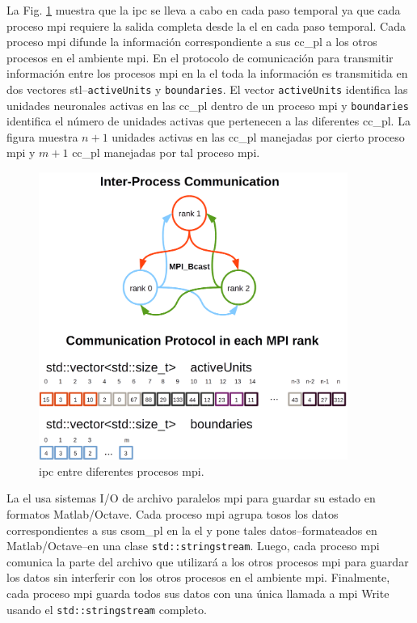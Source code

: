 {La Fig. \ref{fig:BCast} muestra que la \gls{ipc} se lleva a cabo en cada paso temporal ya que cada proceso \gls{mpi} requiere la salida completa desde la \gls{el} en cada paso temporal.
Cada proceso \gls{mpi} difunde la información correspondiente a sus \gls{cc_pl} a los otros procesos en el ambiente \gls{mpi}.
En el protocolo de comunicación para transmitir información entre los procesos \gls{mpi} en la \gls{el} toda la información es transmitida en dos vectores \gls{stl}--\texttt{activeUnits} y \texttt{boundaries}.
El vector \texttt{activeUnits} identifica las unidades neuronales activas en las \gls{cc_pl} dentro de un proceso \gls{mpi} y \texttt{boundaries} identifica el número de unidades activas que pertenecen a las diferentes \gls{cc_pl}.
La figura muestra $n+1$ unidades activas en las \gls{cc_pl} manejadas por cierto proceso \gls{mpi} y $m+1$ \gls{cc_pl} manejadas por tal proceso \gls{mpi}.

\begin{figure}[h!]
    \centering
    \includegraphics[width=0.9\textwidth]{BCast.png}
    \caption{\gls{ipc} entre diferentes procesos \gls{mpi}.}
    \label{fig:BCast}
\end{figure}

La \gls{el} usa sistemas I/O de archivo paralelos \gls{mpi} para guardar su estado en formatos Matlab/Octave.
Cada proceso \gls{mpi} agrupa tosos los datos correspondientes a sus \gls{csom_pl} en la \gls{el} y pone tales datos--formateados en Matlab/Octave--en una clase \texttt{std::stringstream}.
Luego, cada proceso \gls{mpi} comunica la parte del archivo que utilizará a los otros procesos \gls{mpi} para guardar los datos sin interferir con los otros procesos en el ambiente \gls{mpi}.
Finalmente, cada proceso \gls{mpi} guarda todos sus datos con una única llamada a \gls{mpi} Write usando el \texttt{std::stringstream} completo.

}
